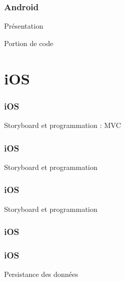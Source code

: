 \documentclass{beamer}
\begin{document}
\begin{frame}
\frametitle{Android}
\begin{block}{Présentation}
\end{block}

\end{frame}

\begin{frame}
\begin{block}{Portion de code}
\end{block}
   
\end{frame}



\section{iOS}

\begin{frame}
\frametitle{iOS}
	\begin{block}{Storyboard et programmation  : MVC}
	\end{block}
\end{frame}

\begin{frame}
\frametitle{iOS}
\begin{block}{Storyboard et programmation }
	\end{block}

\end{frame}


\begin{frame}
	\frametitle{iOS}
	\begin{block}{Storyboard et programmation}
	\end{block}
\end{frame}


\begin{frame}
\frametitle{iOS}
	\frametitle{iOS}
	\begin{block}{Persistance des données}
	\end{block}
\end{frame}

\end{document}
